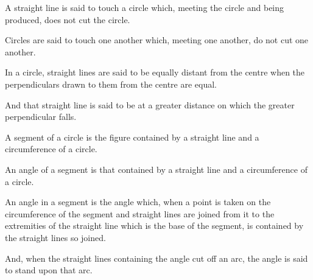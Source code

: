 \documentclass{rrxiv}
\begin{document}
\begin{scope}
\label{def:III.2}
A straight line is said to touch a circle which, meeting the circle
and being produced, does not cut the circle.
\end{scope}

\begin{scope}
\label{def:III.3}
Circles are said to touch one another which, meeting one another, do
not cut one another.
\end{scope}

\begin{scope}
\label{def:III.4}
In a circle, straight lines are said to be equally distant from the
centre when the perpendiculars drawn to them from the centre are
equal.
\end{scope}

\begin{scope}
\label{def:III.5}
And that straight line is said to be at a greater distance on which
the greater perpendicular falls.
\end{scope}

\begin{scope}
\label{def:III.6}
A segment of a circle is the figure contained by a straight line and
a circumference of a circle.
\end{scope}

\begin{scope}
\label{def:III.7}
An angle of a segment is that contained by a straight line and a
circumference of a circle.
\end{scope}

\begin{scope}
\label{def:III.8}
An angle in a segment is the angle which, when a point is taken on
the circumference of the segment and straight lines are joined from
it to the extremities of the straight line which is the base of the
segment, is contained by the straight lines so joined.
\end{scope}

\begin{scope}
\label{def:III.9}
And, when the straight lines containing the angle cut off an arc, the
angle is said to stand upon that arc.
\end{scope}
\end{document}
